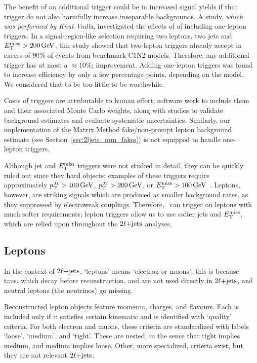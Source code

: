 The benefit of an additional trigger could be in increased signal yields if
that trigger do not also harmfully increase inseparable backgrounds.
A study, \emph{which was performed by Knut Vadla}, investigated the effects
of of including one-lepton triggers.
In a signal-region-like selection requiring two leptons, two jets and
$\met > 200\,\eV[G]$, this study showed that two-lepton triggers already accept
in excess of $90\%$ of events from benchmark C1N2 models.
Therefore, any additional trigger has at most a $\approx10\%$;
improvement. Adding one-lepton triggers was found to increase efficiency by
only a few percentage points, depending on the model.
We considered that to be too little to be worthwhile.

Costs of triggers are attributable to human effort;
software work to include them and their associated Monte Carlo weights, along
with studies to validate background estimates and evaluate systematic
uncertainties.
Similarly, our implementation of the Matrix Method fake/non-prompt lepton
background estimate (see Section~\ref{sec:2ljets_mm_fakes}) is not equipped to
handle one-lepton triggers.

Although jet and $\met$ triggers were not studied in detail, they can be
quickly ruled out since they hard objects: examples of these triggers require
approximately $\ptjone > 400\,\eV[G]$, $p_\mathrm{T}^{\,j_3} > 200\,\eV[G]$, or
$\met > 100\,\eV[G]$~\cite{atlas_twiki_lowest_unprescaled}.
Leptons, however, are striking signals which are produced as smaller background
rates, as they suppressed by electroweak couplings.
Therefore, \atlas\ can trigger on leptons with much softer requirements;
lepton triggers allow us to use softer jets and $\met$, which are relied upon
throughout the $\twoljets$ analyses.


\subsection{Leptons}
In the context of $\twoljets$, `leptons' means `electron-or-muons';
this is because taus, which decay before reconstruction, and are not used
directly in $\twoljets$, and neutral leptons (the neutrinos) go missing.

Reconstructed lepton objects feature momenta, charges, and flavours.
Each is included only if it satisfies certain kinematic and
is identified with `quality' criteria.
For both electron and muons, these criteria are standardized with labels
`loose', `medium', and `tight'.
These are nested, in the sense that tight implies medium,
and medium implies loose.
Other, more specialized, criteria exist, but they are not relevant $\twoljets$.

